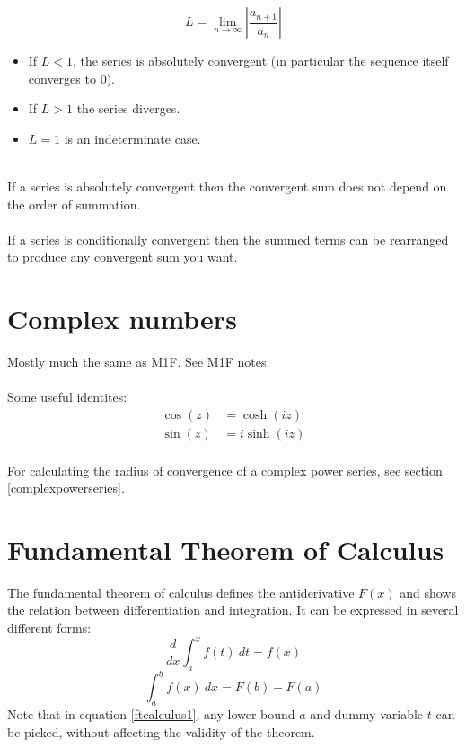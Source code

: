 \documentclass{scrartcl}
\begin{document}
\begin{equation}
L = \lim_{n \to \infty} |\frac{a_{n+1}}{a_{n}}|
\end{equation}
\begin{itemize}
\item If $ L < 1 $, the series is absolutely convergent (in particular the sequence itself converges to $ 0 $).
\item If $ L > 1 $ the series diverges.
\item $ L = 1 $ is an indeterminate case.
\end{itemize}
\noindent
\\
If a series is absolutely convergent then the convergent sum does not depend on the order of summation.
\\\\
If a series is conditionally convergent then the summed terms can be rearranged to produce any convergent sum you want.

\section{Complex numbers}
Mostly much the same as M1F. See M1F notes.
\\\\
Some useful identites:
\begin{align}
\cos(z) & = \cosh(iz) \\
\sin(z) & = i \sinh(iz)
\end{align}
\\
For calculating the radius of convergence of a complex power series, see section \ref{complexpowerseries}.

\section{Fundamental Theorem of Calculus}
The fundamental theorem of calculus defines the antiderivative $ F(x) $ and shows the relation between differentiation and integration. It can be expressed in several different forms:
\begin{equation} \label{ftcalculus1}
\frac{d}{dx} \int_{a}^{x} f(t) \ dt = f(x)
\end{equation}
\begin{equation}
\int_{a}^{b} f(x) \ dx = F(b) - F(a)
\end{equation}
Note that in equation \ref{ftcalculus1}, any lower bound $ a $ and dummy variable $ t $ can be picked, without affecting the validity of the theorem.
\end{document}
